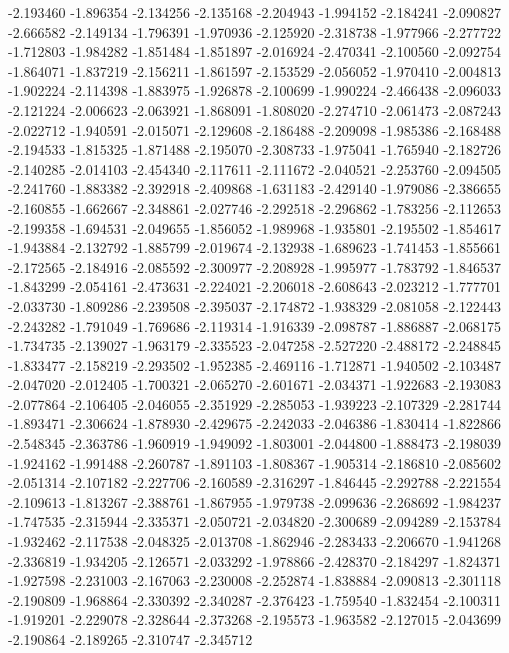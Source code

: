 -2.193460
-1.896354
-2.134256
-2.135168
-2.204943
-1.994152
-2.184241
-2.090827
-2.666582
-2.149134
-1.796391
-1.970936
-2.125920
-2.318738
-1.977966
-2.277722
-1.712803
-1.984282
-1.851484
-1.851897
-2.016924
-2.470341
-2.100560
-2.092754
-1.864071
-1.837219
-2.156211
-1.861597
-2.153529
-2.056052
-1.970410
-2.004813
-1.902224
-2.114398
-1.883975
-1.926878
-2.100699
-1.990224
-2.466438
-2.096033
-2.121224
-2.006623
-2.063921
-1.868091
-1.808020
-2.274710
-2.061473
-2.087243
-2.022712
-1.940591
-2.015071
-2.129608
-2.186488
-2.209098
-1.985386
-2.168488
-2.194533
-1.815325
-1.871488
-2.195070
-2.308733
-1.975041
-1.765940
-2.182726
-2.140285
-2.014103
-2.454340
-2.117611
-2.111672
-2.040521
-2.253760
-2.094505
-2.241760
-1.883382
-2.392918
-2.409868
-1.631183
-2.429140
-1.979086
-2.386655
-2.160855
-1.662667
-2.348861
-2.027746
-2.292518
-2.296862
-1.783256
-2.112653
-2.199358
-1.694531
-2.049655
-1.856052
-1.989968
-1.935801
-2.195502
-1.854617
-1.943884
-2.132792
-1.885799
-2.019674
-2.132938
-1.689623
-1.741453
-1.855661
-2.172565
-2.184916
-2.085592
-2.300977
-2.208928
-1.995977
-1.783792
-1.846537
-1.843299
-2.054161
-2.473631
-2.224021
-2.206018
-2.608643
-2.023212
-1.777701
-2.033730
-1.809286
-2.239508
-2.395037
-2.174872
-1.938329
-2.081058
-2.122443
-2.243282
-1.791049
-1.769686
-2.119314
-1.916339
-2.098787
-1.886887
-2.068175
-1.734735
-2.139027
-1.963179
-2.335523
-2.047258
-2.527220
-2.488172
-2.248845
-1.833477
-2.158219
-2.293502
-1.952385
-2.469116
-1.712871
-1.940502
-2.103487
-2.047020
-2.012405
-1.700321
-2.065270
-2.601671
-2.034371
-1.922683
-2.193083
-2.077864
-2.106405
-2.046055
-2.351929
-2.285053
-1.939223
-2.107329
-2.281744
-1.893471
-2.306624
-1.878930
-2.429675
-2.242033
-2.046386
-1.830414
-1.822866
-2.548345
-2.363786
-1.960919
-1.949092
-1.803001
-2.044800
-1.888473
-2.198039
-1.924162
-1.991488
-2.260787
-1.891103
-1.808367
-1.905314
-2.186810
-2.085602
-2.051314
-2.107182
-2.227706
-2.160589
-2.316297
-1.846445
-2.292788
-2.221554
-2.109613
-1.813267
-2.388761
-1.867955
-1.979738
-2.099636
-2.268692
-1.984237
-1.747535
-2.315944
-2.335371
-2.050721
-2.034820
-2.300689
-2.094289
-2.153784
-1.932462
-2.117538
-2.048325
-2.013708
-1.862946
-2.283433
-2.206670
-1.941268
-2.336819
-1.934205
-2.126571
-2.033292
-1.978866
-2.428370
-2.184297
-1.824371
-1.927598
-2.231003
-2.167063
-2.230008
-2.252874
-1.838884
-2.090813
-2.301118
-2.190809
-1.968864
-2.330392
-2.340287
-2.376423
-1.759540
-1.832454
-2.100311
-1.919201
-2.229078
-2.328644
-2.373268
-2.195573
-1.963582
-2.127015
-2.043699
-2.190864
-2.189265
-2.310747
-2.345712
